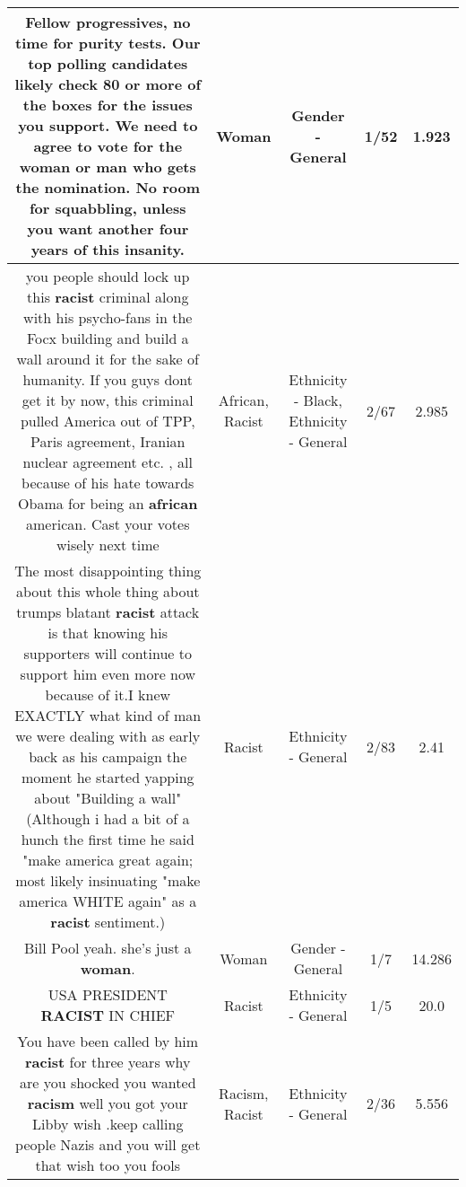 \documentclass[11pt]{article}
\newlength\mylength
\begin{document}
\begin{center}
\begin{longtable}{|C{.65\mylength}|C{.30\mylength}|C{.12\mylength}|C{.12\mylength}|C{.12\mylength}|}
  \small Fellow progressives, no time for purity tests. Our top polling candidates likely check 80 or more of the boxes for the issues you support. We need to agree to vote for the \textbf{woman} or man who gets the nomination. No room for squabbling, unless you want another four years of this insanity.\normalsize   & Woman & Gender - General & 1/52 & 1.923 \\  \hline
  \small you people should lock up this \textbf{racist} criminal along with his psycho-fans in the Focx building and build a wall around it for the sake of humanity. If you guys dont get it by now, this criminal pulled America out of TPP, Paris agreement, Iranian nuclear agreement etc. , all because of his hate towards Obama for being an \textbf{african} american. Cast your votes wisely next time\normalsize   & African, Racist & Ethnicity - Black, Ethnicity - General & 2/67 & 2.985 \\  \hline
  \small The most disappointing thing about this whole thing about trumps blatant \textbf{racist} attack is that knowing his supporters will continue to support him even more now because of it.I knew EXACTLY what kind of man we were dealing with as early  back as his campaign the moment he started yapping about "Building a wall"  (Although i had a bit of a hunch the first time he said "make america great again; most likely insinuating "make america WHITE again" as a \textbf{racist} sentiment.)\normalsize   & Racist & Ethnicity - General & 2/83 & 2.41 \\  \hline
  \small Bill Pool yeah. she's just a \textbf{woman}.\normalsize   & Woman & Gender - General & 1/7 & 14.286 \\  \hline
  \small USA PRESIDENT \textbf{RACIST} IN CHIEF\normalsize   & Racist & Ethnicity - General & 1/5 & 20.0 \\  \hline
  \small You have been called by him \textbf{racist} for three years why are you shocked you wanted \textbf{racism} well you got your Libby wish .keep calling people Nazis and you will get that wish too you fools\normalsize   & Racism, Racist & Ethnicity - General & 2/36 & 5.556 \\  \hline

\end{longtable}
\end{center}
\end{document}
